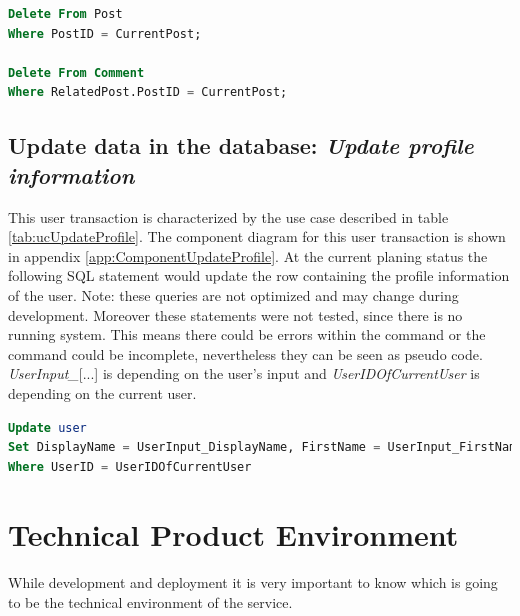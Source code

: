 \documentclass[11pt,a4paper]{report}
\begin{document}
\begin{lstlisting}[frame=single, language=SQL, caption=\emph{Delete Post} SQL statement, keepspaces=true, breaklines=true]
Delete From Post
Where PostID = CurrentPost;

Delete From Comment
Where RelatedPost.PostID = CurrentPost;
\end{lstlisting}

\subsection{Update data in the database: \emph{Update profile information}}
This user transaction is characterized by the use case described in table \vref{tab:ucUpdateProfile}. The component diagram for this user transaction is shown in appendix \vref{app:ComponentUpdateProfile}. At the current planing status the following SQL statement would update the row containing the profile information of the user. Note: these queries are not optimized and may change during development. Moreover these statements were not tested, since there is no running system. This means there could be errors within the command or the command could be incomplete, nevertheless they can be seen as pseudo code. \emph{UserInput\_}[...] is depending on the user's input and \emph{UserIDOfCurrentUser} is depending on the current user.

\begin{lstlisting}[frame=single, language=SQL, caption=\emph{Update Profile Information} SQL statement, keepspaces=true, breaklines=true]
Update user
Set DisplayName = UserInput_DisplayName, FirstName = UserInput_FirstName, LastName = UserInput_LastName, DateOfBirth = UserInput_DateOfBirth, RelationshipStatus = UserInput_RelationshipStatus, Gender = UserInput_Gender, EMail = UserInput_EMail, Street = UserInput_Street, HouseNr = UserInput_HouseNr, Town = UserInput_Town, Zip = UserInput_Zip, Picture = UserInput_Picture, Password =  UserInput_Password
Where UserID = UserIDOfCurrentUser
\end{lstlisting}

\section{Technical Product Environment}
While development and deployment it is very important to know which is going to be the technical environment of the service.
\end{document}
